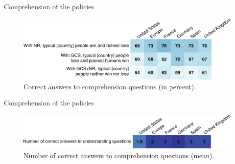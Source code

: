 \documentclass[aspectratio=169,xcolor=dvipsnames, 11pt,mathserif]{beamer}
\begin{document}
\begin{framefont}{\small}
\begin{frame}{Comprehension of the policies}\label{understanding}
    \begin{figure}[h!]
        \caption[Comprehension]{Correct answers to comprehension questions (in percent). \hyperlink{gcs_support}{}}\label{fig:understood_each}
        \includegraphics[width=\textwidth]{../figures/country_comparison/understood_each_positive.pdf}
    \end{figure}    
\end{frame}

\begin{frame}{Comprehension of the policies}
\begin{figure}[h!]
    \caption[Comprehension score]{Number of correct answers to comprehension questions (mean). \hyperlink{gcs_support}{}}\label{fig:understood_score}
    \includegraphics[width=\textwidth]{../figures/country_comparison/understood_score_mean.pdf} 
\end{figure}
\end{frame}


\end{framefont}
\end{document}
